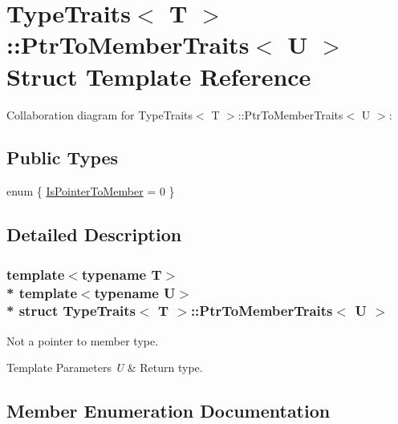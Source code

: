 \hypertarget{structTypeTraits_1_1PtrToMemberTraits}{}\section{Type\+Traits$<$ T $>$\+:\+:Ptr\+To\+Member\+Traits$<$ U $>$ Struct Template Reference}
\label{structTypeTraits_1_1PtrToMemberTraits}


Collaboration diagram for Type\+Traits$<$ T $>$\+:\+:Ptr\+To\+Member\+Traits$<$ U $>$\+:
\subsection*{Public Types}
\begin{DoxyCompactItemize}
\item 
enum \{ \hyperlink{structTypeTraits_1_1PtrToMemberTraits_ac65412cea299498a1da35e4ba0ebcd51af61f80f131426931b6089817f9867806}{Is\+Pointer\+To\+Member} = 0
 \}
\end{DoxyCompactItemize}


\subsection{Detailed Description}
\subsubsection*{template$<$typename T$>$\\*
template$<$typename U$>$\\*
struct Type\+Traits$<$ T $>$\+::\+Ptr\+To\+Member\+Traits$<$ U $>$}

Not a pointer to member type. 
\begin{DoxyTemplParams}{Template Parameters}
{\em U} & Return type. \\
\hline
\end{DoxyTemplParams}


\subsection{Member Enumeration Documentation}
